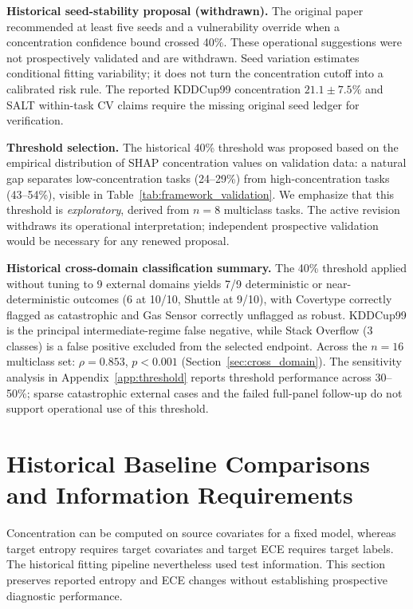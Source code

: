 \documentclass[accepted]{uai2026} %
\begin{document}
\noindent\textbf{Historical seed-stability proposal (withdrawn).} The original paper recommended at least five seeds and a vulnerability override when a concentration confidence bound crossed 40\%. These operational suggestions were not prospectively validated and are withdrawn. Seed variation estimates conditional fitting variability; it does not turn the concentration cutoff into a calibrated risk rule. The reported KDDCup99 concentration $21.1\pm7.5\%$ and SALT within-task CV claims require the missing original seed ledger for verification.

\noindent\textbf{Threshold selection.} The historical 40\% threshold was proposed based on the empirical distribution of SHAP concentration values on validation data: a natural gap separates low-concentration tasks (24--29\%) from high-concentration tasks (43--54\%), visible in Table~\ref{tab:framework_validation}. We emphasize that this threshold is \textit{exploratory}, derived from $n=8$ multiclass tasks. The active revision withdraws its operational interpretation; independent prospective validation would be necessary for any renewed proposal.

\noindent\textbf{Historical cross-domain classification summary.} The 40\% threshold applied without tuning to 9 external domains yields 7/9 deterministic or near-deterministic outcomes (6 at 10/10, Shuttle at 9/10), with Covertype correctly flagged as catastrophic and Gas Sensor correctly unflagged as robust. KDDCup99 is the principal intermediate-regime false negative, while Stack Overflow (3 classes) is a false positive excluded from the selected endpoint. Across the $n=16$ multiclass set: $\rho = 0.853$, $p < 0.001$ (Section~\ref{sec:cross_domain}). The sensitivity analysis in Appendix~\ref{app:threshold} reports threshold performance across 30--50\%; sparse catastrophic external cases and the failed full-panel follow-up do not support operational use of this threshold.

\section{Historical Baseline Comparisons and Information Requirements}\label{app:baselines}

Concentration can be computed on source covariates for a fixed model, whereas target entropy requires target covariates and target ECE requires target labels. The historical fitting pipeline nevertheless used test information. This section preserves reported entropy and ECE changes without establishing prospective diagnostic performance.
\end{document}

